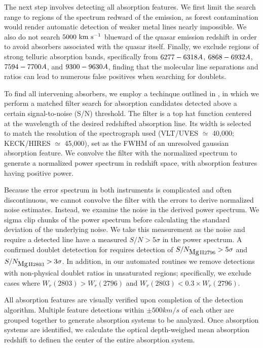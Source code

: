 \message{ !name(Paper_v1.tex)}\documentclass[iop,apj,numberedappendix,appendixfloats,twocolappendix]{emulateapj}
\begin{document}
The next step involves detecting all {\MgII} absorption features. We first limit the search range to regions of the spectrum redward of the {\Lya} emission, as {\Lya} forest contamination would render automatic detection of weaker metal lines nearly impossible. We also do not search $5000~\hbox{km~s$^{-1}$}$ blueward of the quasar emission redshift in order to avoid absorbers associated with the quasar itself. Finally, we exclude regions of strong telluric absorption bands, specifically from $6277 - 6318 \AA$, $6868 - 6932 \AA$, $7594 - 7700 \AA$, and $9300 - 9630 \AA$, finding that the molecular line separations and ratios can lead to numerous false positives when searching for {\MgII} doublets. 

To find all intervening {\MgIIdblt} absorbers, we employ a techinque outlined in \cite{Zhu2013}, in which we perform a matched filter search for absorption candidates detected above a certain signal-to-noise (S/N) threshold. The filter is a top hat function centered at the wavelength of the desired redshifted absorption line. Its width is selected to match the resolution of the spectrograph used (VLT/UVES $\simeq$ 40,000; KECK/HIRES $\simeq$ 45,000), set as the FWHM of an unresolved gaussian absorption feature. We convolve the filter with the normalized spectrum to generate a normalized power spectrum in redshift space, with absorption features having positive power. 

Because the error spectrum in both instruments is complicated and often discontinuous, we cannot convolve the filter with the errors to derive normalized noise estimates. Instead, we examine the noise in the derived power spectrum. We sigma clip chunks of the power spectrum before calculating the standard deviation of the underlying noise. We take this measurement as the noise and require a detected line have a measured $S/N > 5\sigma$ in the power spectrum. A confirmed doublet detetection for {\MgIIdblt} requires detection of $S/N_{\hbox{{\rm Mg}\kern 0.1em{\sc ii}}2796} > 5\sigma$ and $S/N_{\hbox{{\rm Mg}\kern 0.1em{\sc ii}}2803} > 3\sigma$. In addition, in our automated routines we remove detections with non-physical doublet ratios in unsaturated regions; specifically, we exclude cases where $W_r(2803) > W_r(2796)$ and $W_r(2803) < 0.3 \times W_r(2796)$.

All absorption features are visually verified upon completion of the detection algorithm. Multiple feature detections within $\pm 500 km/s$ of each other are grouped together to generate absorption systems to be analyzed. Once absorption systems are identified, we calculate the optical depth-weighed mean absorption redshift to definen the center of the entire absorption system. 
\end{document}
